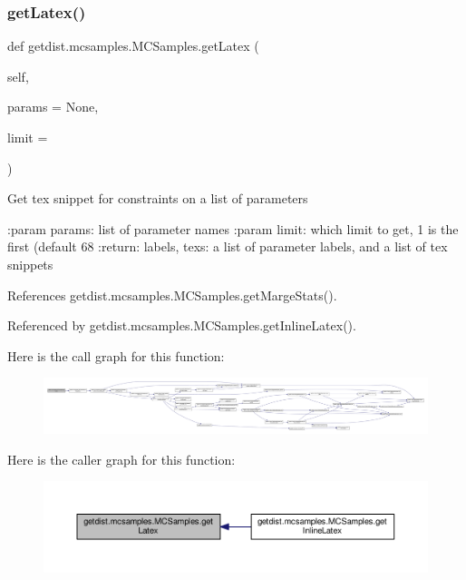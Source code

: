 \subsubsection{\texorpdfstring{get\+Latex()}{getLatex()}}
{\footnotesize\ttfamily def getdist.\+mcsamples.\+M\+C\+Samples.\+get\+Latex (\begin{DoxyParamCaption}\item[{}]{self,  }\item[{}]{params = {\ttfamily None},  }\item[{}]{limit = {} }\end{DoxyParamCaption})}

\begin{DoxyVerb}Get tex snippet for constraints on a list of parameters

:param params: list of parameter names
:param limit: which limit to get, 1 is the first (default 68%
:return: labels, texs: a list of parameter labels, and a list of tex snippets
\end{DoxyVerb}
 

References getdist.\+mcsamples.\+M\+C\+Samples.\+get\+Marge\+Stats().



Referenced by getdist.\+mcsamples.\+M\+C\+Samples.\+get\+Inline\+Latex().

Here is the call graph for this function\+:
\nopagebreak
\begin{figure}[H]
\begin{center}
\leavevmode
\includegraphics[width=350pt]{classgetdist_1_1mcsamples_1_1MCSamples_aa4fc7b33808a24cb90238f2b24500899_cgraph}
\end{center}
\end{figure}
Here is the caller graph for this function\+:
\nopagebreak
\begin{figure}[H]
\begin{center}
\leavevmode
\includegraphics[width=350pt]{classgetdist_1_1mcsamples_1_1MCSamples_aa4fc7b33808a24cb90238f2b24500899_icgraph}
\end{center}
\end{figure}
\mbox{\label{classgetdist_1_1mcsamples_1_1MCSamples_aef6e63fe8a242f19517dd5bbdf6d3b2a}} 
